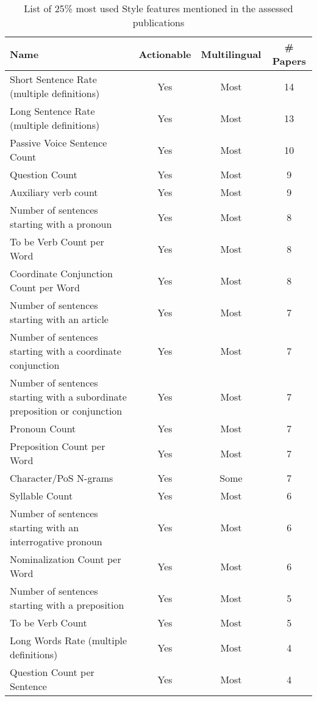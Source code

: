 \begin{table}[htbp]
    \caption{List of 25\% most used Style features mentioned in the assessed publications}
    \label{tab:feat_Style}
    \centering
    \begin{tabular}{m{} c c c}
        \toprule
        \textbf{Name} & \textbf{Actionable} & \textbf{Multilingual} & \textbf{\# Papers} \\ 
        \midrule
        Short Sentence Rate (multiple definitions)  & Yes & Most & 14 \\
        Long Sentence Rate (multiple definitions) & Yes & Most & 13 \\
        Passive Voice Sentence Count & Yes & Most & 10 \\
        Question Count & Yes & Most & 9 \\
        Auxiliary verb count & Yes & Most & 9 \\
        Number of sentences starting with a pronoun & Yes & Most & 8 \\
        To be Verb Count per Word & Yes & Most & 8 \\
        Coordinate Conjunction Count per Word & Yes & Most & 8 \\
        Number of sentences starting with an article & Yes & Most & 7 \\
        Number of sentences starting with a coordinate conjunction & Yes & Most & 7 \\
        Number of sentences starting with a subordinate preposition or conjunction & Yes & Most & 7 \\
        Pronoun Count & Yes & Most & 7 \\
        Preposition Count per Word & Yes & Most & 7 \\
        Character/PoS N-grams & Yes & Some & 7 \\
        Syllable Count & Yes & Most & 6 \\
        Number of sentences starting with an interrogative pronoun & Yes & Most & 6 \\
        Nominalization Count per Word & Yes & Most & 6 \\
        Number of sentences starting with a preposition & Yes & Most & 5 \\
        To be Verb Count & Yes & Most & 5 \\
        Long Words Rate (multiple definitions) & Yes & Most & 4 \\
        Question Count per Sentence & Yes & Most & 4 \\

\end{tabular}
\end{table}

